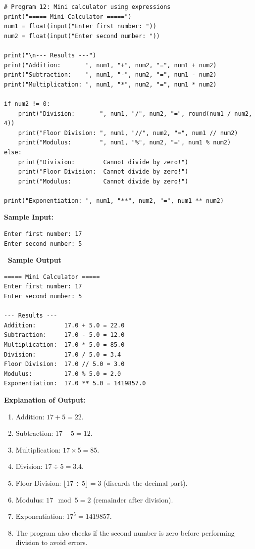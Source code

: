\documentclass[12pt,a4paper]{article}
\newcommand{\outhead}{\noindent\colorbox{cmrgreen!25}%
  {\textbf{\small\color{cmrdark}~Sample Output~}}\par\vspace{-1pt}}
\begin{document}
\begin{lstlisting}
# Program 12: Mini calculator using expressions
print("===== Mini Calculator =====")
num1 = float(input("Enter first number: "))
num2 = float(input("Enter second number: "))

print("\n--- Results ---")
print("Addition:       ", num1, "+", num2, "=", num1 + num2)
print("Subtraction:    ", num1, "-", num2, "=", num1 - num2)
print("Multiplication: ", num1, "*", num2, "=", num1 * num2)

if num2 != 0:
    print("Division:       ", num1, "/", num2, "=", round(num1 / num2, 4))
    print("Floor Division: ", num1, "//", num2, "=", num1 // num2)
    print("Modulus:        ", num1, "%", num2, "=", num1 % num2)
else:
    print("Division:        Cannot divide by zero!")
    print("Floor Division:  Cannot divide by zero!")
    print("Modulus:         Cannot divide by zero!")

print("Exponentiation: ", num1, "**", num2, "=", num1 ** num2)
\end{lstlisting}

\textbf{Sample Input:}
\begin{verbatim}
Enter first number: 17
Enter second number: 5
\end{verbatim}

\outhead
\begin{lstlisting}[style=outputstyle]
===== Mini Calculator =====
Enter first number: 17
Enter second number: 5

--- Results ---
Addition:        17.0 + 5.0 = 22.0
Subtraction:     17.0 - 5.0 = 12.0
Multiplication:  17.0 * 5.0 = 85.0
Division:        17.0 / 5.0 = 3.4
Floor Division:  17.0 // 5.0 = 3.0
Modulus:         17.0 % 5.0 = 2.0
Exponentiation:  17.0 ** 5.0 = 1419857.0
\end{lstlisting}

\textbf{Explanation of Output:}
\begin{enumerate}
  \item Addition: $17 + 5 = 22$.
  \item Subtraction: $17 - 5 = 12$.
  \item Multiplication: $17 \times 5 = 85$.
  \item Division: $17 \div 5 = 3.4$.
  \item Floor Division: $\lfloor 17 \div 5 \rfloor = 3$ (discards the decimal part).
  \item Modulus: $17 \mod 5 = 2$ (remainder after division).
  \item Exponentiation: $17^5 = 1419857$.
  \item The program also checks if the second number is zero before performing division to avoid errors.
\end{enumerate}
\end{document}
